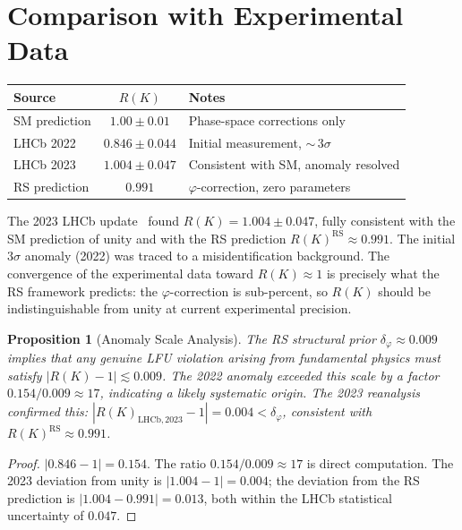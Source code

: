 \documentclass[12pt,a4paper]{article}
\newtheorem{proposition}[theorem]{Proposition}
\theoremstyle{definition}
\theoremstyle{remark}
\begin{document}
\section{Comparison with Experimental Data}
\label{sec:data}

\begin{center}
\renewcommand{\arraystretch}{1.3}
\begin{tabular}{@{}lcl@{}}
\toprule
\textbf{Source} & \textbf{$R(K)$} & \textbf{Notes} \\
\midrule
SM prediction & $1.00 \pm 0.01$ & Phase-space corrections only \\
LHCb 2022 & $0.846 \pm 0.044$ & Initial measurement, ${\sim}\,3\sigma$ \\
LHCb 2023~\cite{LHCb2023update} & $1.004 \pm 0.047$ & Consistent with SM, anomaly resolved \\
RS prediction & $0.991$ & $\varphi$-correction, zero parameters \\
\bottomrule
\end{tabular}
\end{center}

The 2023 LHCb update~\cite{LHCb2023update} found $R(K) = 1.004 \pm 0.047$,
fully consistent with the SM prediction of unity and with the RS prediction
$R(K)^{\mathrm{RS}} \approx 0.991$.  The initial $3\sigma$ anomaly (2022)
was traced to a misidentification background.  The convergence of the
experimental data toward $R(K) \approx 1$ is precisely what the RS
framework predicts: the $\varphi$-correction is sub-percent, so $R(K)$
should be indistinguishable from unity at current experimental precision.

\begin{proposition}[Anomaly Scale Analysis]
\label{prop:anomaly}
The RS structural prior $\delta_\varphi \approx 0.009$ implies that any
genuine LFU violation arising from fundamental physics must satisfy
$|R(K) - 1| \lesssim 0.009$.  The 2022 anomaly exceeded this scale by
a factor $0.154/0.009 \approx 17$, indicating a likely systematic origin.
The 2023 reanalysis confirmed this: $|R(K)_{\mathrm{LHCb,2023}} - 1| = 0.004
< \delta_\varphi$, consistent with $R(K)^{\mathrm{RS}} \approx 0.991$.
\end{proposition}

\begin{proof}
$|0.846 - 1| = 0.154$.  The ratio $0.154/0.009 \approx 17$ is direct
computation.  The 2023 deviation from unity is $|1.004 - 1| = 0.004$;
the deviation from the RS prediction is $|1.004 - 0.991| = 0.013$,
both within the LHCb statistical uncertainty of $0.047$.
\end{proof}
\end{document}
